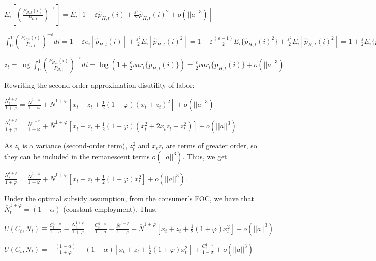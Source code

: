 \documentclass[
]{article}
\begin{document}
\(\displaystyle E_i\left[ \left(\frac{P_{H,t}(i)}{P_{H,t}} \right)^{-\varepsilon} \right]= E_i \left[ 1-\varepsilon \widehat{p}_{H,t}(i)+ \frac{\varepsilon^2}{2} \widehat{p}_{H,t}(i)^2+o(||a||^3) \right]\)

\(\displaystyle \int_0^1 \left(\frac{P_{H,t}(i)}{P_{H,t}} \right)^{-\varepsilon} di= 1-\varepsilon e_i[\widehat{p}_{H,t}(i)]+ \frac{\varepsilon^2}{2} E_i[\widehat{p}_{H,t}(i)^2]=1-\varepsilon \frac{(\varepsilon-1)}{2}E_i \{ \widehat{p}_{H,t}(i)^2\} + \frac{\varepsilon^2}{2} E_i[\widehat{p}_{H,t}(i)^2]=1+\frac{\varepsilon}{2}E_i \{ \widehat{p}_{H,t}(i)^2\}=1+\frac{\varepsilon}{2}var_i\{p_{H,t}(i)\}\)

\(\displaystyle z_t= \log \int_0^1 \left(\frac{P_{H,t}(i)}{P_{H,t}} \right)^{-\varepsilon} di = \log \left( 1+\frac{\varepsilon}{2}var_i\{p_{H,t}(i)\} \right)= \frac{\varepsilon}{2}var_i\{p_{H,t}(i)\} +o(||a||^3)\)

Rewriting the second-order approximation disutility of labor:

\(\displaystyle \frac{N_t^{1+\varphi}}{1+\varphi} = \frac{\overline{N}^{1+\varphi}}{1+\varphi} +\overline{N}^{1+\varphi}\left[ x_t+z_t + \frac{1}{2}(1+\varphi)(x_t+z_t)^2 \right] + o(||a||^3)\)

\(\displaystyle \frac{N_t^{1+\varphi}}{1+\varphi} = \frac{\overline{N}^{1+\varphi}}{1+\varphi} +\overline{N}^{1+\varphi}\left[ x_t+z_t + \frac{1}{2}(1+\varphi)(x_t^2+2 x_tz_t + z_t^2) \right] + o(||a||^3)\)

As \(z_t\) is a variance (second-order term), \(z_t^2\) and \(x_t z_t\)
are terms of greater order, so they can be included in the remanescent
terms \(o(||a||^3)\). Thus, we get

\(\displaystyle \frac{N_t^{1+\varphi}}{1+\varphi} = \frac{\overline{N}^{1+\varphi}}{1+\varphi} +\overline{N}^{1+\varphi}\left[ x_t+z_t + \frac{1}{2}(1+\varphi)x_t^2 \right] + o(||a||^3)\).

Under the optimal subsidy assumption, from the consumer's FOC, we have
that \(\overline{N}_t^{1+\varphi}=(1-\alpha)\) (constant employment).
Thus,

\(\displaystyle U(C_t,N_t)\equiv \frac{C_t^{1-\sigma}}{1-\sigma}-\frac{N_t^{1+\varphi}}{1+\varphi}= \frac{C_t^{1-\sigma}}{1-\sigma}- \frac{\overline{N}^{1+\varphi}}{1+\varphi} -\overline{N}^{1+\varphi}\left[ x_t+z_t + \frac{1}{2}(1+\varphi)x_t^2 \right] + o(||a||^3)\)

\(\displaystyle U(C_t,N_t) = - \frac{(1-\alpha)}{1+\varphi}-(1-\alpha)\left[ x_t+z_t + \frac{1}{2}(1+\varphi)x_t^2 \right] + \frac{C_t^{1-\sigma}}{1-\sigma}+ o(||a||^3)\)
\end{document}
